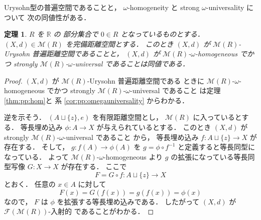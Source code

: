 \documentclass[leqno, 12pt]{jsarticle}
\newtheorem{thm}{定理}[section]
\newcommand{\rr}{\mathbb{R}}
\newcommand{\Met}[1]{\mathscr{M}(#1)}
\newcommand{\FinitePart}[1]{\mathscr{F}(#1)}
\newcommand{\FinMet}[1]{\FinitePart{\Met{#1}}}
\begin{document}
Urysohn型の普遍空間であることと，
$\omega$-homogeneity
と
strong
$\omega$-universality
について
次の同値性がある．
\begin{thm}\label{thm:pp:equiv}
$R$
を
$\rr$
の
部分集合で
$0\in R$
となっているものとする．
$(X, d)\in \Met{R}$
を完備距離空間とする．
このとき
$(X, d)$
が
$\Met{R}$-Urysohn
普遍距離空間であることと，
$(X, d)$
が
$\Met{R}$-$\omega$-homogeneous
でかつ
strongly
$\Met{R}$-$\omega$-universal
であることは同値である．
\end{thm}
\begin{proof}
$(X, d)$
が
$\Met{R}$-Urysohn
普遍距離空間である
ときに
$\Met{R}$-$\omega$-homogeneous
でかつ
strongly
$\Met{R}$-$\omega$-universal
であること
は定理
\ref{thm:pp:hom}と
系
 \ref{cor:pp:omegauniversality}
からわかる．

逆を示そう．
$(A\sqcup\{z\}, e)$
を有限距離空間とし，
$\Met{R}$
に入っているとする．
等長埋め込み
$\phi\colon  A\to X$
が与えられているとする．
このとき
$(X, d)$%
が
strongly
$\Met{R}$-$\omega$-universal
であること
から，
等長埋め込み
$f\colon  A\sqcup \{z\}\to X$
が存在する．
そして，
$g\colon  f(A)\to \phi(A)$
を
$g=\phi\circ f^{-1}$
と定義すると等長同型になっている．
よって
$\Met{R}$-$\omega$-homogeneous
より
$g$
の拡張になっている等長同型写像
$G\colon  X\to X$
が存在する．
ここで
\[
F=G\circ f\colon A\sqcup\{z\}\longrightarrow X
\]
とおく．
任意の
$x\in A$
に対して
\[
F(x)=G(f(x))=g(f(x))=\phi(x)
\]
なので，
$F$
は
$\phi$
を拡張する等長埋め込みである．
したがって
$(X, d)$
が
$\FinMet{R}$-入射的
であることがわかる．
\end{proof}
\end{document}
